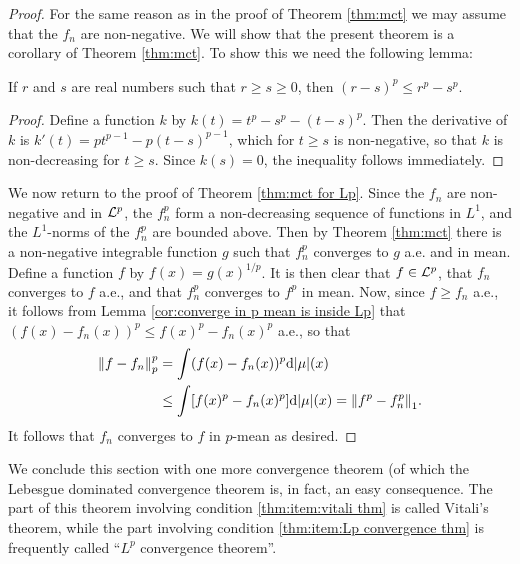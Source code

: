 \begin{proof}
For the same reason as in the proof of Theorem \ref{thm:mct} we may assume that the $f_n$ are non-negative. We will show that the present theorem is a corollary of Theorem \ref{thm:mct}. To show this we need the following lemma:

\begin{lemma}
If $r$ and $s$ are real numbers such that $r\geq s\geq 0$, then $(r-s)^p\leq r^p-s^p$.
\end{lemma}

\begin{proof}
Define a function $k$ by $k(t)=t^p-s^p-(t-s)^p$. Then the derivative of $k$ is $k'(t)=pt^{p-1}-p(t-s)^{p-1}$, which for $t\geq s$ is non-negative, so that $k$ is non-decreasing for $t\geq s$. Since $k(s)=0$, the inequality follows immediately.
\end{proof}

We now return to the proof of Theorem \ref{thm:mct for Lp}. Since the $f_n$ are non-negative and in ${\cal L}^p$, the $f_n^p$ form a non-decreasing sequence of functions in $L^1$, and the $L^1$-norms of the $f_n^p$ are bounded above. Then by Theorem \ref{thm:mct} there is a non-negative integrable function $g$ such that $f_n^p$ converges to $g$ a.e. and in mean. Define a function $f$ by $f(x)=g(x)^{1/p}$. It is then clear that $f\in{\cal L}^p$, that $f_n$ converges to $f$ a.e., and that $f_n^p$ converges to $f^p$ in mean. Now, since $f \geq f_n$ a.e., it follows from Lemma \ref{cor:converge in p mean is inside Lp} that $(f(x)-f_n(x))^p\leq f(x)^p-f_n(x)^p$ a.e., so that
\begin{align*}
    \norm{f-f_n}_p^p&=\int(f(x)-f_n(x))^p\dd|\mu|(x) \\
    &\leq\int[f(x)^p-f_n(x)^p]\dd|\mu|(x)=\norm{f^p-f_n^p}_1.
\end{align*}
It follows that $f_n$ converges to $f$ in $p$-mean as desired.
\end{proof}

We conclude this section with one more convergence theorem (of which the Lebesgue dominated convergence theorem is, in fact, an easy consequence. The part of this theorem involving condition \ref{thm:item:vitali thm} is called Vitali's theorem, while the part involving condition \ref{thm:item:Lp convergence thm} is frequently called ``$L^p$ convergence theorem''.

